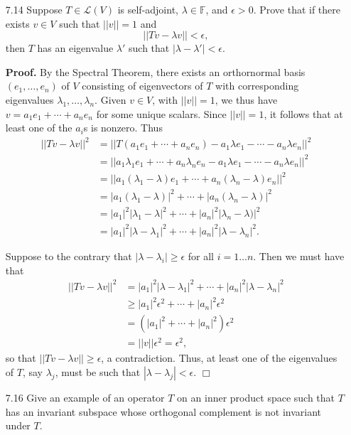 \documentclass[9pt]{article}
\newcommand{\qed}{\hfill \ensuremath{\Box}}
\newcommand{\F}{\mathbb{F}}
\begin{document}
\begin{enumerate}
   \item[7.14] Suppose $T \in \mathcal{L}(V)$ is self-adjoint, $\lambda \in \F$,
               and $\epsilon > 0$. Prove that if there exists $v \in V$ such
               that $||v|| = 1$ and
               $$||Tv - \lambda v|| < \epsilon,$$
               then $T$ has an eigenvalue $\lambda'$ such that
               $|\lambda - \lambda'| < \epsilon$.
               
      \textbf{Proof.} By the Spectral Theorem, there exists an orthornormal
      basis $(e_1, \ldots, e_n)$ of $V$ consisting of eigenvectors of $T$ with
      corresponding eigenvalues $\lambda_1, \ldots, \lambda_n$. Given $v \in V$,
      with $||v|| = 1$, we thus have $v = a_1e_1 + \cdots + a_ne_n$ for some
      unique scalars. Since $||v|| = 1$, it follows that at least one of the
      $a_i$s is nonzero. Thus
      \begin{align*}
         ||Tv - \lambda v||^2 &=  ||T(a_1e_1 + \cdots + a_ne_n)-a_1\lambda e_1 - \cdots -
                                    a_n\lambda e_n||^2 \\
            &= ||a_1\lambda_1e_1 + \cdots + a_n\lambda_ne_n-a_1\lambda e_1 - \cdots -
                 a_n\lambda e_n||^2 \\
            &= ||a_1(\lambda_1 - \lambda)e_1 + \cdots + a_n(\lambda_n - \lambda)e_n||^2 \\
            &= |a_1(\lambda_1 - \lambda)|^2 + \cdots + |a_n(\lambda_n - \lambda)|^2 \\
            &= |a_1|^2|\lambda_1 - \lambda|^2 + \cdots + |a_n|^2|\lambda_n - \lambda)|^2 \\
            &= |a_1|^2|\lambda - \lambda_1|^2 + \cdots + |a_n|^2|\lambda - \lambda_n|^2.
      \end{align*}
      
      Suppose to the contrary that $|\lambda - \lambda_i| \ge \epsilon$ for all
      $i = 1 \ldots n$. Then we must have that
      \begin{align*}
         ||Tv - \lambda v||^2 &= |a_1|^2|\lambda - \lambda_1|^2 + \cdots + |a_n|^2|\lambda - \lambda_n|^2 \\
        & \ge |a_1|^2\epsilon^2 + \cdots + |a_n|^2\epsilon^2 \\
        &= (|a_1|^2 + \cdots + |a_n|^2)\epsilon^2 \\
        &= ||v||\epsilon^2 = \epsilon^2,
      \end{align*}
      so that $||Tv - \lambda v|| \ge \epsilon$, a contradiction. Thus, at least
      one of the eigenvalues of $T$, say $\lambda_j$, must be such that
      $|\lambda - \lambda_j| < \epsilon$. \qed
   \item[7.16] Give an example of an operator $T$ on an inner product space such
               that $T$ has an invariant subspace whose orthogonal complement is
               not invariant under $T$.


\end{enumerate}
\end{document}
